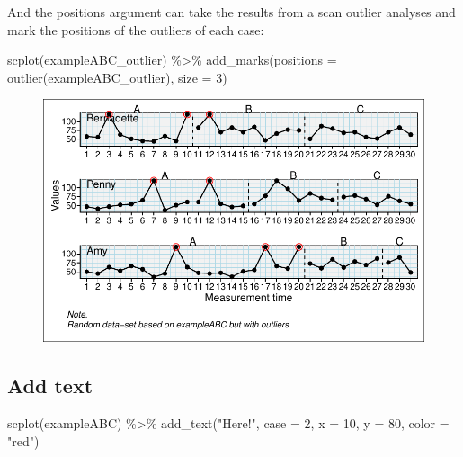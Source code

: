 \documentclass[
  letterpaper,
  DIV=11,
  numbers=noendperiod]{scrreprt}
\newenvironment{Shaded}{\begin{snugshade}}{\end{snugshade}}
\newcommand{\AttributeTok}[1]{\textcolor[rgb]{0.40,0.45,0.13}{#1}}
\newcommand{\DecValTok}[1]{\textcolor[rgb]{0.68,0.00,0.00}{#1}}
\newcommand{\FunctionTok}[1]{\textcolor[rgb]{0.28,0.35,0.67}{#1}}
\newcommand{\NormalTok}[1]{\textcolor[rgb]{0.00,0.23,0.31}{#1}}
\newcommand{\SpecialCharTok}[1]{\textcolor[rgb]{0.37,0.37,0.37}{#1}}
\newcommand{\StringTok}[1]{\textcolor[rgb]{0.13,0.47,0.30}{#1}}
\begin{document}
And the positions argument can take the results from a scan outlier
analyses and mark the positions of the outliers of each case:

\begin{Shaded}
\begin{Highlighting}[]
\FunctionTok{scplot}\NormalTok{(exampleABC\_outlier) }\SpecialCharTok{\%\textgreater{}\%} 
  \FunctionTok{add\_marks}\NormalTok{(}\AttributeTok{positions =} \FunctionTok{outlier}\NormalTok{(exampleABC\_outlier), }\AttributeTok{size =} \DecValTok{3}\NormalTok{)}
\end{Highlighting}
\end{Shaded}

\begin{figure}[H]

{\centering \includegraphics{./ch_scplot_files/figure-pdf/scplot-marks-3-1.pdf}

}

\end{figure}

\hypertarget{add-text}{%
\subsection{Add text}\label{add-text}}

\begin{Shaded}
\begin{Highlighting}[]
\FunctionTok{scplot}\NormalTok{(exampleABC) }\SpecialCharTok{\%\textgreater{}\%}
  \FunctionTok{add\_text}\NormalTok{(}\StringTok{"Here!"}\NormalTok{, }\AttributeTok{case =} \DecValTok{2}\NormalTok{, }\AttributeTok{x =} \DecValTok{10}\NormalTok{, }\AttributeTok{y =} \DecValTok{80}\NormalTok{, }\AttributeTok{color =} \StringTok{"red"}\NormalTok{)}
\end{Highlighting}
\end{Shaded}
\end{document}
